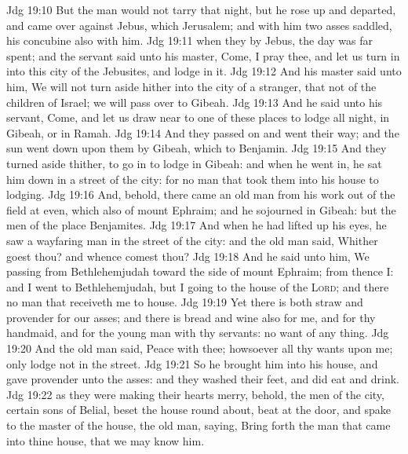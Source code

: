 \vs Jdg 19:10 But the man would not tarry that night, but he rose up and departed, and came over against Jebus, which  Jerusalem; and  with him two asses saddled, his concubine also  with him.
\vs Jdg 19:11  when they  by Jebus, the day was far spent; and the servant said unto his master, Come, I pray thee, and let us turn in into this city of the Jebusites, and lodge in it.
\vs Jdg 19:12 And his master said unto him, We will not turn aside hither into the city of a stranger, that  not of the children of Israel; we will pass over to Gibeah.
\vs Jdg 19:13 And he said unto his servant, Come, and let us draw near to one of these places to lodge all night, in Gibeah, or in Ramah.
\vs Jdg 19:14 And they passed on and went their way; and the sun went down upon them  by Gibeah, which  to Benjamin.
\vs Jdg 19:15 And they turned aside thither, to go in  to lodge in Gibeah: and when he went in, he sat him down in a street of the city: for  no man that took them into his house to lodging.
\vs Jdg 19:16 And, behold, there came an old man from his work out of the field at even, which  also of mount Ephraim; and he sojourned in Gibeah: but the men of the place  Benjamites.
\vs Jdg 19:17 And when he had lifted up his eyes, he saw a wayfaring man in the street of the city: and the old man said, Whither goest thou? and whence comest thou?
\vs Jdg 19:18 And he said unto him, We  passing from Bethlehemjudah toward the side of mount Ephraim; from thence  I: and I went to Bethlehemjudah, but I  going to the house of the \textsc{Lord}; and there  no man that receiveth me to house.
\vs Jdg 19:19 Yet there is both straw and provender for our asses; and there is bread and wine also for me, and for thy handmaid, and for the young man  with thy servants:  no want of any thing.
\vs Jdg 19:20 And the old man said, Peace  with thee; howsoever  all thy wants  upon me; only lodge not in the street.
\vs Jdg 19:21 So he brought him into his house, and gave provender unto the asses: and they washed their feet, and did eat and drink.
\vs Jdg 19:22  as they were making their hearts merry, behold, the men of the city, certain sons of Belial, beset the house round about,  beat at the door, and spake to the master of the house, the old man, saying, Bring forth the man that came into thine house, that we may know him.
